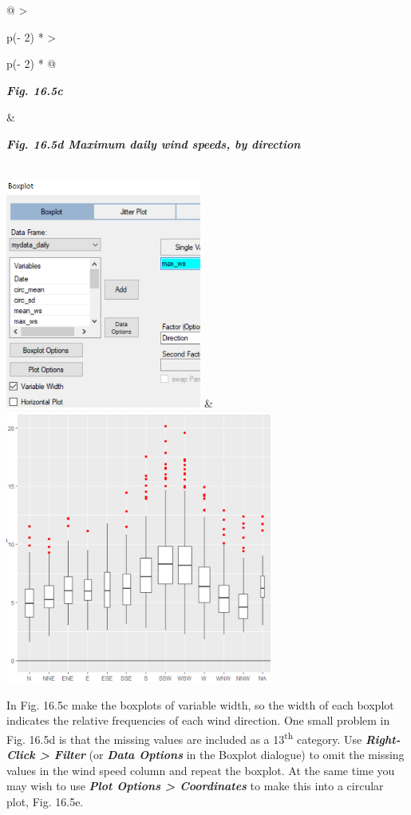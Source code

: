 \documentclass[
  letterpaper,
  DIV=11,
  numbers=noendperiod]{scrreprt}
\begin{document}
\begin{longtable}[]{@{}
  >{\raggedright\arraybackslash}p{(\columnwidth - 2\tabcolsep) * }
  >{\raggedright\arraybackslash}p{(\columnwidth - 2\tabcolsep) * }@{}}
\toprule\noalign{}
\begin{minipage}[b]{\linewidth}\raggedright
\textbf{\emph{Fig. 16.5c}}
\end{minipage} & \begin{minipage}[b]{\linewidth}\raggedright
\textbf{\emph{Fig. 16.5d Maximum daily wind speeds, by direction}}
\end{minipage} \\
\midrule\noalign{}
\endhead
\bottomrule\noalign{}
\endlastfoot
\includegraphics[width=2.53439in,height=2.97656in]{figures/Fig16.5c.png}
&
\includegraphics[width=3.45173in,height=3.53701in]{figures/Fig16.5d.png} \\
\end{longtable}

In Fig. 16.5c make the boxplots of variable width, so the width of each
boxplot indicates the relative frequencies of each wind direction. One
small problem in Fig. 16.5d is that the missing values are included as a
13\textsuperscript{th} category. Use \textbf{\emph{Right-Click
\textgreater{} Filter}} (or \textbf{\emph{Data Options}} in the Boxplot
dialogue) to omit the missing values in the wind speed column and repeat
the boxplot. At the same time you may wish to use \textbf{\emph{Plot
Options \textgreater{} Coordinates}} to make this into a circular plot,
Fig. 16.5e.
\end{document}
